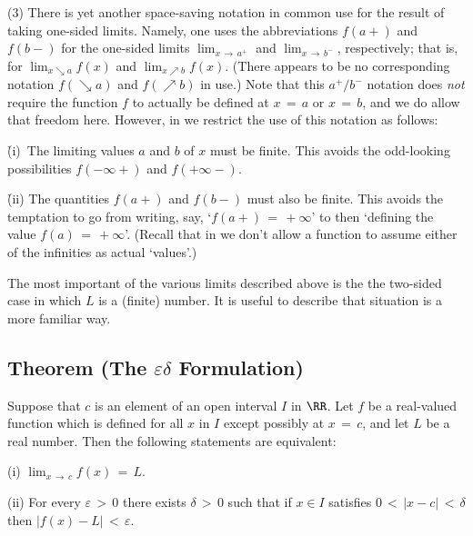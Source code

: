 {\V

        (3) There is yet another space-saving notation in common use for the result of taking one-sided limits.
    Namely, one uses the abbreviations $f(a+)$ and $f(b-)$ for the one-sided limits
    $\lim_{x \,{\rightarrow}\, a^{+}}$ and $\lim_{x \,{\rightarrow}\, b^{-}}$, respectively;
    that is, for $\lim_{x{\searrow}a} f(x)$ and $\lim_{x{\nearrow}b} f(x)$.
    (There appears to be no corresponding notation $f({\searrow}a)$ and $f({\nearrow}b)$ in use.)
    Note that this $a^{+}/b^{-}$ notation does {\em not} require the function $f$ to actually be defined at $x \,=\, a$ or $x \,=\, b$, and we do allow that freedom here.
    However, in {\ThisText} we restrict the use of this notation as follows:

        \h (i)\, The limiting values $a$ and $b$ of $x$ must be finite. This avoids the odd-looking possibilities $f(-{\infty}+)$ and $f(+{\infty}-)$.

        \h (ii) The quantities $f(a+)$ and $f(b-)$ must also be finite. This avoids the temptation to go from writing, say, `$f(a+) \,=\, +{\infty}$' to then `defining the value $f(a) \,=\, +{\infty}$'.
    (Recall that in {\ThisText} we don't allow a function to assume either of the infinities as actual `values'.)

\VV

        The most important of the various limits described above is the the two-sided case in which $L$ is a (finite) number.
    It is useful to describe that situation is a more familiar way.

\V

            \subsection{\small{\bf Theorem} (The ${\varepsilon}{\delta}$ Formulation)}
            \label{ThmC90.15}

        Suppose that $c$ is an element of an open interval $I$ in ${\RR}$.
    Let $f$ be a real-valued function which is defined for all $x$ in $I$ except possibly at $x \,=\, c$, and let $L$ be a real number.
    Then the following statements are equivalent:

        (i) ${\displaystyle \lim_{x \,{\rightarrow}\, c} f(x) \,=\, L}$.

\V

        (ii) For every ${\varepsilon}\,>\,0$ there exists ${\delta}\,>\,0$ such that if $x{\in}I$ satisfies $0\,<\,|x-c|\,<\,{\delta}$ then $|f(x)-L|\,<\,{\varepsilon}$.

}
